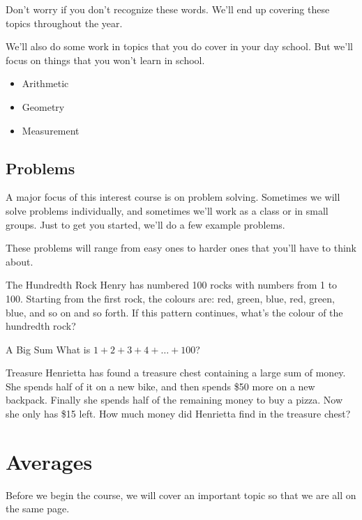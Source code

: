 \documentclass[a4paper,10pt]{report}
\begin{document}
Don't worry if you don't recognize these words. We'll end up covering these
topics throughout the year.

We'll also do some work in topics that you do cover in your day school. But
we'll focus on things that you won't learn in school.

\begin{itemize}
 \item Arithmetic
 \item Geometry
 \item Measurement
\end{itemize}

\section{Problems}
A major focus of this interest course is on problem solving. Sometimes we will
solve problems individually, and sometimes we'll work as a class or in small
groups. Just to get you started, we'll do a few example problems.

These problems will range from easy ones to harder ones that you'll have to
think about.

\begin{problem}{The Hundredth Rock}
 Henry has numbered 100 rocks with numbers from 1 to 100. Starting from the
 first rock, the colours are: red, green, blue, red, green, blue, and so on and
 so forth. If this pattern continues, what's the colour of the hundredth rock?
\end{problem}

\begin{problem}{A Big Sum}
 What is $1+2+3+4+\ldots+100$?
\end{problem}

\begin{problem}{Treasure}
 Henrietta has found a treasure chest containing a large sum of money. She
 spends half of it on a new bike, and then spends \$50 more on a new backpack.
 Finally she spends half of the remaining money to buy a pizza. Now she only has
 \$15 left. How much money did Henrietta find in the treasure chest?
\end{problem}

\chapter{Averages}

Before we begin the course, we will cover an important topic so that we are all
on the same page.
\end{document}
